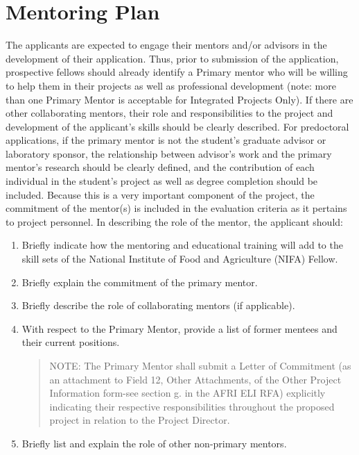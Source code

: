 \documentclass[12pt,letterpaper]{article}
\begin{document}


\section{Mentoring Plan}

The applicants are expected to engage their mentors and/or advisors in the
development of their application. Thus, prior to submission of the
application, prospective fellows should already identify a Primary mentor who
will be willing to help them in their projects as well as professional
development (note: more than one Primary Mentor is acceptable for Integrated
Projects Only). If there are other collaborating mentors, their role and
responsibilities to the project and development of the applicant's skills
should be clearly described. For predoctoral applications, if the primary
mentor is not the student's graduate advisor or laboratory sponsor, the
relationship between advisor's work and the primary mentor's research should
be clearly defined, and the contribution of each individual in the student's
project as well as degree completion should be included. Because this is a
very important component of the project, the commitment of the mentor(s) is
included in the evaluation criteria as it pertains to project personnel. In
describing the role of the mentor, the applicant should:

\begin{enumerate}

  \item Briefly indicate how the mentoring and educational training will add to the
   skill sets of the National Institute of Food and Agriculture (NIFA) Fellow.

  \item Briefly explain the commitment of the primary mentor.

  \item Briefly describe the role of collaborating mentors (if applicable).

  \item With respect to the Primary Mentor, provide a list of former mentees and
   their current positions. 
   \begin{quote}
   NOTE: The Primary Mentor shall submit a Letter of Commitment (as an
   attachment to Field 12, Other Attachments, of the Other Project
   Information form-see section g. in the AFRI ELI RFA) explicitly
   indicating their respective responsibilities throughout the proposed
   project in relation to the Project Director.
   \end{quote}

  \item Briefly list and explain the role of other non-primary mentors.

\end{enumerate}
\end{document}
